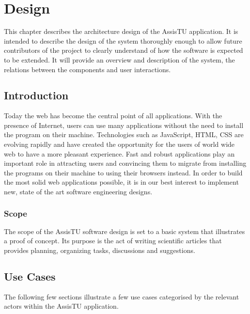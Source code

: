\chapter{Design}

This chapter describes the architecture design of the AssisTU application. It is intended to describe the design of the system 
thoroughly enough to allow future contributors of the project to clearly understand of how the software is expected to be extended. It will provide 
an overview and description of the system, the relations between the components and user interactions.

\section{Introduction} %
\label{sec:introduction}

Today the web has become the central point of all applications. With the presence of Internet, users can use many applications without the need to 
install the program on their machine. Technologies such as JavaScript, HTML, CSS are evolving rapidly and have created the opportunity for the users of 
world wide web to have a more pleasant experience. Fast and robust applications play an important role in attracting users and convincing them to 
migrate from installing the programs on their machine to using their browsers instead. In order to build the most solid web applications possible, 
it is in our best interest to implement new, state of the art software engineering designs.


\subsection{Scope} %
\label{sub:scope}
The scope of the AssisTU software design is set to a basic system that illustrates a proof of concept. Its purpose is the act of writing 
scientific articles that provides planning, organizing tasks, discussions and suggestions.

\section{Use Cases} %
\label{sec:system_overview}
The following few sections illustrate a few use cases categorised by the relevant actors within the AssisTU application.
